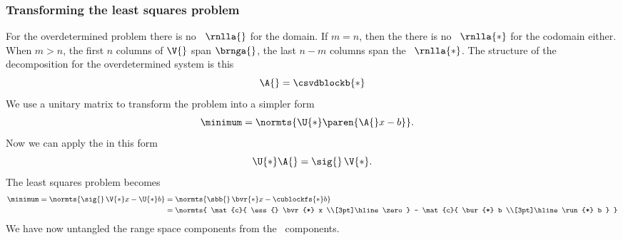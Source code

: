 \subsubsection{Transforming the least squares problem}
For the overdetermined problem there is no \ns \ $\rnlla{}$ for the domain. If $m=n$, then the there is no \ns \ $\rnlla{*}$ for the codomain either. When $m > n$, the first $n$ columns of $\V{}$ span $\brnga{}$, the last $n-m$ columns span the  \ns \ $\rnlla{*}$. The structure of the decomposition for the overdetermined system is this
\begin{equation}
  \A{} = \csvdblockb{*} 
\end{equation}
We use a unitary matrix to transform the problem into a simpler form
\begin{equation}
  \begin{split} 
    \minimum 
      &= \normts{ \U{*} \paren{ \A{} x - b }  }.
  \end{split} 
\end{equation}
Now we can apply the \asvd in this form
\begin{equation}
  \U{*} \A{} = \sig{} \, \V{*}.
\end{equation}
The least squares problem becomes
\begin{equation}
  \begin{split} 
    \minimum 
      = \normts{ \sig{} \, \V{*} x - \U{*} b }
      &= \normts{ \sbb{} \, \bvr{*} x - \cublockfs{*} b } \\
	    &= \normts{ \mat{c}{ \ess{} \bvr{*} x \\[3pt]\hline\zero  } - \mat{c}{ \bur{*} b \\[3pt]\hline \run{*} b } }
  \end{split} 
\end{equation}
We have now untangled the range space components from the \ns \ components.


